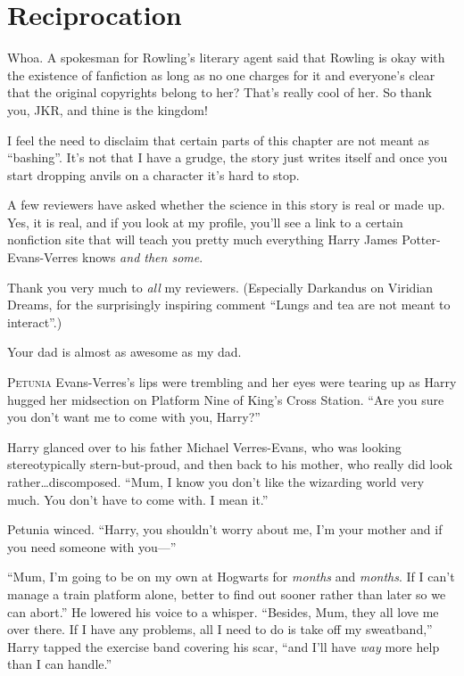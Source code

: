 \chapter{Reciprocation}

\begin{chapterOpeningAuthorNote}
Whoa. A spokesman for Rowling's literary agent said that Rowling is okay with the existence of fanfiction as long as no one charges for it and everyone's clear that the original copyrights belong to her? That's really cool of her. So thank you, JKR, and thine is the kingdom!

I feel the need to disclaim that certain parts of this chapter are not meant as “bashing”. It's not that I have a grudge, the story just writes itself and once you start dropping anvils on a character it's hard to stop.

A few reviewers have asked whether the science in this story is real or made up. Yes, it is real, and if you look at my profile, you'll see a link to a certain nonfiction site that will teach you pretty much everything Harry James Potter-Evans-Verres knows \emph{and then some}.

Thank you very much to \emph{all} my reviewers. (Especially Darkandus on Viridian Dreams, for the surprisingly inspiring comment “Lungs and tea are not meant to interact”.)
\end{chapterOpeningAuthorNote}
\begin{chapterOpeningQuote}
Your dad is almost as awesome as my dad.
\end{chapterOpeningQuote}

\lettrine{P}{etunia} Evans-Verres’s lips were trembling and her eyes were tearing up as Harry hugged her midsection on Platform Nine of King’s Cross Station. “Are you sure you don’t want me to come with you, Harry?”

Harry glanced over to his father Michael Verres-Evans, who was looking stereotypically stern-but-proud, and then back to his mother, who really did look rather…discomposed. “Mum, I know you don’t like the wizarding world very much. You don’t have to come with. I mean it.”

Petunia winced. “Harry, you shouldn’t worry about me, I’m your mother and if you need someone with you—”

“Mum, I’m going to be on my own at Hogwarts for \emph{months} and \emph{months}. If I can’t manage a train platform alone, better to find out sooner rather than later so we can abort.” He lowered his voice to a whisper. “Besides, Mum, they all love me over there. If I have any problems, all I need to do is take off my sweatband,” Harry tapped the exercise band covering his scar, “and I’ll have \emph{way} more help than I can handle.”


